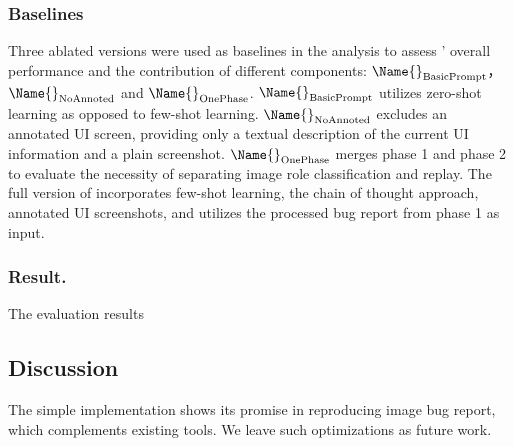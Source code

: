 \subsubsection{Baselines}
Three ablated versions were used as baselines in the analysis to assess \Name{}' overall performance and the contribution of  different components:  \(\Name{}_{\text{BasicPrompt}}\)，  \(\Name{}_{\text{NoAnnoted}}\) and 
\(\Name{}_{\text{OnePhase}}\).
%
\textbf{\(\Name{}_{\text{BasicPrompt}}\)} utilizes zero-shot learning as opposed to few-shot learning.
%
\textbf{\(\Name{}_{\text{NoAnnoted}}\)}  excludes an annotated UI screen, providing only a textual description of the current UI information and a plain screenshot.
%
\(\Name{}_{\text{OnePhase}}\) merges phase 1 and phase 2 to evaluate the necessity of separating image role classification and replay.
%
The full version of\textbf{ \Name{}} incorporates few-shot learning, the chain of thought approach, annotated UI screenshots, and utilizes the processed bug report from phase 1 as input.

\subsubsection{Result.} 
The evaluation results

\subsection{Discussion}
The simple implementation shows its promise in reproducing image bug report, which complements existing tools. 
We leave such optimizations as future work.